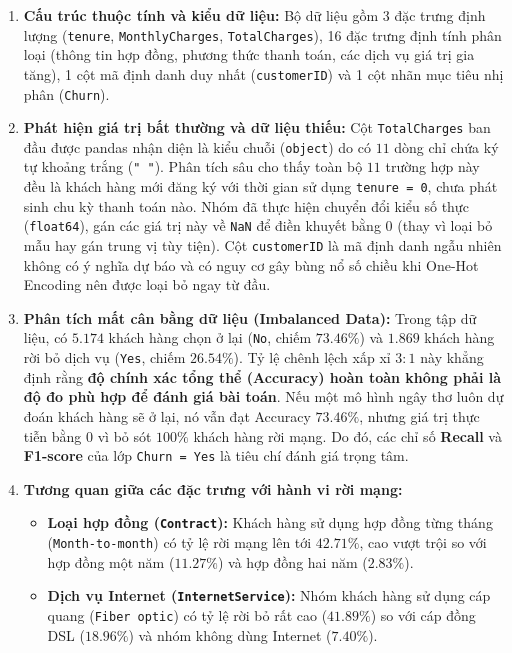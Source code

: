 \documentclass[12pt,a4paper]{article}
\begin{document}
\begin{enumerate}
    \item \textbf{Cấu trúc thuộc tính và kiểu dữ liệu:} Bộ dữ liệu gồm 3 đặc trưng định lượng (\texttt{tenure}, \texttt{MonthlyCharges}, \texttt{TotalCharges}), 16 đặc trưng định tính phân loại (thông tin hợp đồng, phương thức thanh toán, các dịch vụ giá trị gia tăng), 1 cột mã định danh duy nhất (\texttt{customerID}) và 1 cột nhãn mục tiêu nhị phân (\texttt{Churn}).
    \item \textbf{Phát hiện giá trị bất thường và dữ liệu thiếu:} Cột \texttt{TotalCharges} ban đầu được pandas nhận diện là kiểu chuỗi (\texttt{object}) do có $11$ dòng chỉ chứa ký tự khoảng trắng (\texttt{" "}). Phân tích sâu cho thấy toàn bộ $11$ trường hợp này đều là khách hàng mới đăng ký với thời gian sử dụng \texttt{tenure = 0}, chưa phát sinh chu kỳ thanh toán nào. Nhóm đã thực hiện chuyển đổi kiểu số thực (\texttt{float64}), gán các giá trị này về \texttt{NaN} để điền khuyết bằng $0$ (thay vì loại bỏ mẫu hay gán trung vị tùy tiện). Cột \texttt{customerID} là mã định danh ngẫu nhiên không có ý nghĩa dự báo và có nguy cơ gây bùng nổ số chiều khi One-Hot Encoding nên được loại bỏ ngay từ đầu.
    \item \textbf{Phân tích mất cân bằng dữ liệu (Imbalanced Data):} Trong tập dữ liệu, có $5.174$ khách hàng chọn ở lại (\texttt{No}, chiếm $73.46\%$) và $1.869$ khách hàng rời bỏ dịch vụ (\texttt{Yes}, chiếm $26.54\%$). Tỷ lệ chênh lệch xấp xỉ $3:1$ này khẳng định rằng \textbf{độ chính xác tổng thể (Accuracy) hoàn toàn không phải là độ đo phù hợp để đánh giá bài toán}. Nếu một mô hình ngây thơ luôn dự đoán khách hàng sẽ ở lại, nó vẫn đạt Accuracy $73.46\%$, nhưng giá trị thực tiễn bằng 0 vì bỏ sót $100\%$ khách hàng rời mạng. Do đó, các chỉ số \textbf{Recall} và \textbf{F1-score} của lớp \texttt{Churn = Yes} là tiêu chí đánh giá trọng tâm.
    \item \textbf{Tương quan giữa các đặc trưng với hành vi rời mạng:}
    \begin{itemize}
        \item \textbf{Loại hợp đồng (\texttt{Contract}):} Khách hàng sử dụng hợp đồng từng tháng (\texttt{Month-to-month}) có tỷ lệ rời mạng lên tới $42.71\%$, cao vượt trội so với hợp đồng một năm ($11.27\%$) và hợp đồng hai năm ($2.83\%$).
        \item \textbf{Dịch vụ Internet (\texttt{InternetService}):} Nhóm khách hàng sử dụng cáp quang (\texttt{Fiber optic}) có tỷ lệ rời bỏ rất cao ($41.89\%$) so với cáp đồng DSL ($18.96\%$) và nhóm không dùng Internet ($7.40\%$).

\end{itemize}
\end{enumerate}
\end{document}
